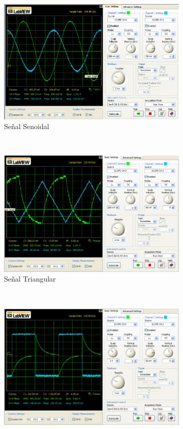 \documentclass[]{article}
\begin{document}
\begin{figure}[h!]
	
	\centering
	\begin{subfigure}[b]{0.45\textwidth}
	\includegraphics[width=\textwidth]{Imagenes/circuito4senoidal.png}
	\caption{Señal Senoidal}
	\label{fig:circuito4seonidal}
\end{subfigure}
~ 
\begin{subfigure}[b]{0.45\textwidth}
	\includegraphics[width=\textwidth]{Imagenes/circuito4triangular.png}
	\caption{Señal Triangular}
	\label{fig:circuito4triangular}
\end{subfigure}
~ 
\begin{subfigure}[b]{0.45\textwidth}
	\includegraphics[width=\textwidth]{Imagenes/circuito4cuadrada.png}

\end{subfigure}
\end{figure}
\end{document}
